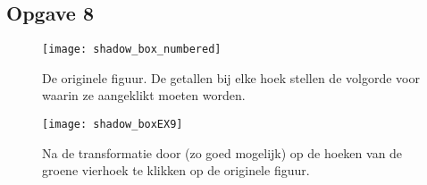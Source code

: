 \documentclass{article}
\begin{document}
	\subsection*{Opgave 8}
	\begin{figure}[!htb]
		\begin{minipage}{0.4\textwidth}
			\centering
			\texttt{[image: shadow\_box\_numbered]}
			\caption{De originele figuur. De getallen bij elke hoek stellen de volgorde voor waarin ze aangeklikt moeten worden.}
			\label{Fig:ex8_1}
		\end{minipage}\hfill
		\begin{minipage}{0.4\textwidth}
			\centering
			\texttt{[image: shadow\_boxEX9]}
			\caption{Na de transformatie door (zo goed mogelijk) op de hoeken van de groene vierhoek te klikken op de originele figuur.}
			\label{Fig:ex8_2}
		\end{minipage}\hfill
	\end{figure}

	
\end{document}
